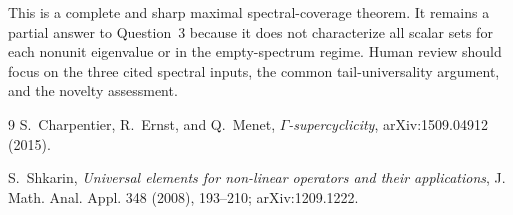 \documentclass[11pt]{article}
\theoremstyle{definition}
\begin{document}
This is a complete and sharp maximal spectral-coverage theorem.  It remains
a partial answer to Question~3 because it does not characterize all scalar
sets for each nonunit eigenvalue or in the empty-spectrum regime.  Human
review should focus on the three cited spectral inputs, the common
tail-universality argument, and the novelty assessment.

\begin{thebibliography}{9}
S.~Charpentier, R.~Ernst, and Q.~Menet,
\emph{$\Gamma$-supercyclicity}, arXiv:1509.04912 (2015).

S.~Shkarin,
\emph{Universal elements for non-linear operators and their applications},
J. Math. Anal. Appl. 348 (2008), 193--210; arXiv:1209.1222.
\end{thebibliography}
\end{document}

